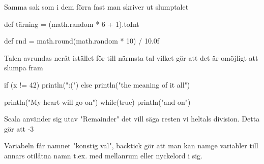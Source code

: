 {{\Subtask  Samma sak som i dem förra fast man skriver ut slumptalet

\Task %

\Subtask {}

\Subtask{}

\Subtask {}

\Subtask{}

\Subtask {}

\Subtask {}

\Subtask {}




\ExtraTasks %

\Task %

\Subtask 
\begin{REPLnonum}
def tärning = (math.random * 6 + 1).toInt
\end{REPLnonum}

\Subtask
\begin{REPLnonum}
def rnd = math.round(math.random * 10) / 10.0f
\end{REPLnonum}

\Subtask
Talen avrundas neråt istället för till närmsta tal vilket gör att det är omöjligt att slumpa fram 

\Task %

\Task %

\begin{Code}
if (x != 42)  println(":(") else println("the meaning of it all")
\end{Code}

\Task %

\Task %

\begin{Code}
println("My heart will go on")
while(true)  println("and on")
\end{Code}

\Task %

\AdvancedTasks %

\Task %
Scala använder sig utav "Remainder" det vill säga resten vi heltals division. Detta gör att -3 %

\Task %

\Subtask
Variabeln får namnet "konstig val", backtick gör att man kan namge variabler till annars otilåtna namn t.ex. med mellanrum eller nyckelord i sig.
 
}}
